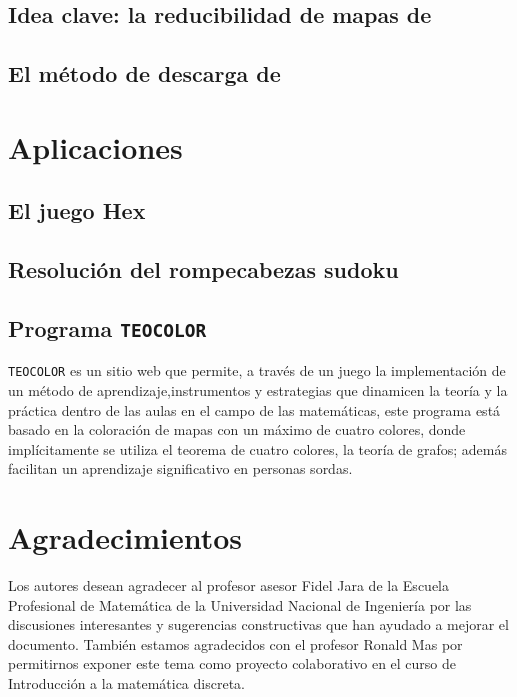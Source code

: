 \documentclass[
	3p,
	times,
	a4paper,
	authoryear
]{elsarticle}%
\begin{document}
\subsection{Idea clave: la reducibilidad de mapas de \citeauthor{birkhoff}}\label{sec:3.4}

\subsection{El método de descarga de \citeauthor{appel}}\label{sec:3.5}

\section{Aplicaciones}\label{sec4}

\subsection{El juego Hex}\label{sec:4.1}

\subsection{Resolución del rompecabezas sudoku}\label{sec:4.2}

\subsection{Programa \texttt{TEOCOLOR}}\label{sec:4.3}

\texttt{TEOCOLOR} es un sitio web que permite, a través de un juego la implementación de un método de aprendizaje,instrumentos y estrategias que dinamicen la teoría y la práctica dentro de las aulas en el campo de las matemáticas, este programa está basado en la coloración de mapas con un máximo de
cuatro colores, donde implícitamente se utiliza el teorema de cuatro colores, la teoría de grafos; además facilitan un aprendizaje significativo en personas sordas.

\section*{Agradecimientos}

Los autores desean agradecer al profesor asesor \linebreak Fidel Jara de la Escuela Profesional de Matemática de la Universidad Nacional de Ingeniería por las  discusiones interesantes y sugerencias constructivas que han ayudado a mejorar el documento. También estamos agradecidos con el profesor Ronald Mas por permitirnos exponer este tema como proyecto colaborativo en el curso de Introducción a la matemática discreta.

\end{document}
